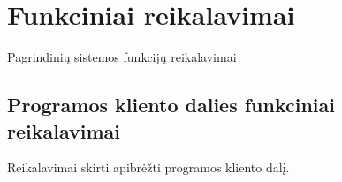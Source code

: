 \documentclass{VUMIFPSkursinis}
\begin{document}
% 
% 
%

\section{Funkciniai reikalavimai}
Pagrindinių sistemos funkcijų reikalavimai

\subsection{Programos kliento dalies funkciniai reikalavimai}
Reikalavimai skirti apibrėžti programos kliento dalį.
\end{document}
